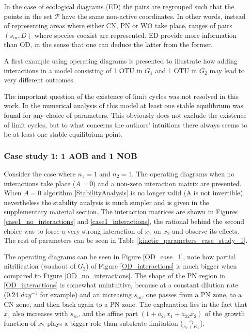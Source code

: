 \documentclass[3p,times]{article}
\begin{document}
In the case of ecological diagrams (ED) the pairs are regrouped such that the points in the set $\mathcal{P}$ have the same non-active coordinates. In other words, instead of representing areas where either CN, PN or WO take place, ranges of pairs $(s_{in},D)$ where species coexist are represented.	ED provide more information than OD, in the sense that one can deduce the latter from the former. 

A first example using operating diagrams is presented to illustrate how adding interactions in a model consisting of 1 OTU in $G_1$ and 1 OTU in $G_2$ may lead to very different outcomes.

The important question of the existence of limit cycles was not resolved in this work. In the numerical analysis of this model at least one stable equilibrium was found for any choice of parameters. This obviously does not exclude the existence of limit cycles, but to what concerns the authors' intuitions there always seems to be at least one stable equilibrium point.

\subsubsection{Case study 1: 1 AOB and 1 NOB}

Consider the case where $n_1 = 1$ and $n_2 = 1$. The operating diagrams when no interactions take place ($A = 0$) and a non-zero interaction matrix are presented. When $A=0$ algorithm \ref{StabilityAnalysis} is no longer valid (A is not invertible), nevertheless the stability analysis is much simpler and is given in the supplementary material section. The interaction matrices are shown in Figures \ref{case1_no_interactions} and \ref{case1_interactions}, the rational behind the second choice was to force a very strong interaction of $x_1$ on $x_2$ and observe its effects. The rest of parameters can be seen in Table \ref{kinetic_parameters_case_study_1}.

The operating diagrams can be seen in Figure \ref{OD_case_1}, note how partial nitrification (washout of $G_2$) of Figure \ref{OD_interactions} is much bigger when compared to Figure \ref{OD_no_interactions}. The shape of the PN region in \ref{OD_interactions} is somewhat unintuitive, because at a constant dilution rate (0.24 $day^{-1}$ for example) and an increasing $s_{in}$, one passes from a PN zone, to a CN zone, and then back again to a PN zone. The explanation lies in the fact that $x_1$ also increases with $s_{in}$, and the affine part $(1+ a_{21}x_1 +a_{22}x_2)$ of the growth function of $x_2$ plays a bigger role than substrate limitation ($\frac{s_2}{s_2+K_2}$). 
\end{document}
